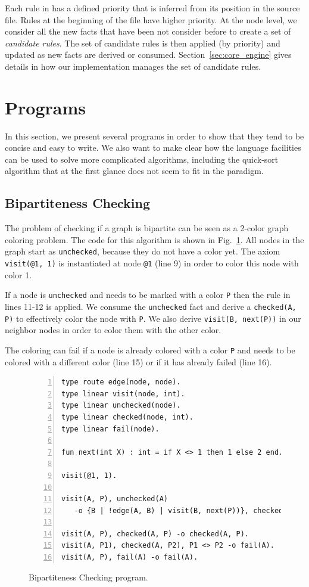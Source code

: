 Each rule in \lang has a defined priority that is inferred from its position in the source file.
Rules at the beginning of the file have higher priority. At the node level, we consider all
the new facts that have been not consider before to create a set of \emph{candidate rules}.
The set of candidate rules is then applied (by priority) and updated as new facts are derived or consumed.
Section~\ref{sec:core_engine} gives details in how our implementation manages the set of candidate rules.

\section{Programs}

In this section, we present several \lang programs in order to show that they tend to be concise and
easy to write. We also want to make clear how the language facilities can be used to solve more
complicated algorithms, including the quick-sort algorithm that at the first glance does not seem
to fit in the \lang paradigm.

\subsection{Bipartiteness Checking}

The problem of checking if a graph is bipartite can be seen as a 2-color graph coloring problem.
The code for this algorithm is shown in Fig.~\ref{code:bichecking}. All nodes in the graph
start as \texttt{unchecked}, because they do not have a color yet. The axiom \texttt{visit(@1, 1)} is
instantiated at node \texttt{@1} (line 9) in order to color this node with color 1.

If a node is \texttt{unchecked} and needs to be marked with a color \texttt{P} then the rule in
lines 11-12 is applied. We consume the \texttt{unchecked} fact and derive a \texttt{checked(A, P)}
to effectively color the node with \texttt{P}. We also derive \texttt{visit(B, next(P))} in
our neighbor nodes in order to color them with the other color.

The coloring can fail if a node is already colored with a color \texttt{P} and needs to be colored
with a different color (line 15) or if it has already failed (line 16).

\begin{figure}[h!]
\small\begin{Verbatim}[numbers=left]
type route edge(node, node).
type linear visit(node, int).
type linear unchecked(node).
type linear checked(node, int).
type linear fail(node).

fun next(int X) : int = if X <> 1 then 1 else 2 end.

visit(@1, 1).

visit(A, P), unchecked(A)
   -o {B | !edge(A, B) | visit(B, next(P))}, checked(A, P).

visit(A, P), checked(A, P) -o checked(A, P).
visit(A, P1), checked(A, P2), P1 <> P2 -o fail(A).
visit(A, P), fail(A) -o fail(A).
\end{Verbatim}
  \caption{Bipartiteness Checking program.}
  \label{code:bichecking}
\end{figure}
\normalsize

